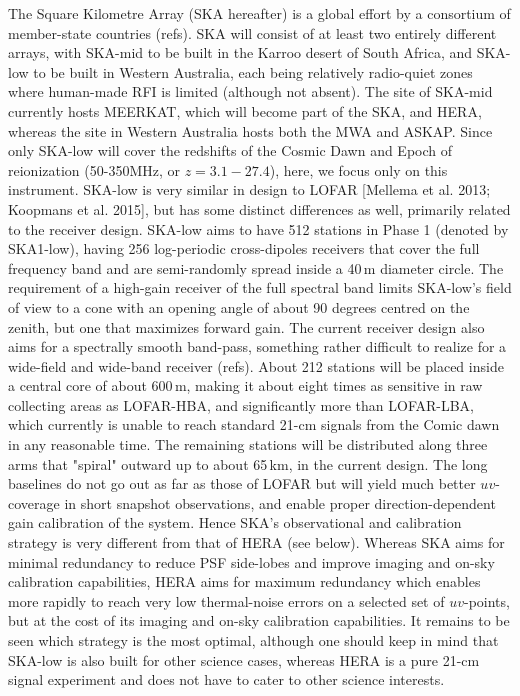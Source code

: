 The Square Kilometre Array (SKA hereafter) is a global effort by a consortium of member-state countries (refs). SKA will consist of at least two entirely different arrays, with SKA-mid to be built in the Karroo desert of South Africa, and SKA-low to be built in Western Australia, each being relatively radio-quiet zones where human-made RFI is limited (although not absent). The site of SKA-mid currently hosts MEERKAT, which will become part of the SKA, and HERA, whereas the site in Western Australia hosts both the MWA and ASKAP. Since only SKA-low will cover the redshifts of the Cosmic Dawn and Epoch of reionization (50-350MHz, or $z=3.1-27.4$), here, we focus only on this instrument. 
%
SKA-low is very similar in design to LOFAR [Mellema et al. 2013; Koopmans et al. 2015], but has some distinct differences as well, primarily related to the receiver design. SKA-low aims to have 512 stations in Phase 1 (denoted by SKA1-low), having 256 log-periodic cross-dipoles receivers that cover the full frequency band and are semi-randomly spread inside a 40\,m diameter circle. The requirement of a high-gain receiver of the full spectral band limits SKA-low's field of view to a cone with an opening angle of about 90 degrees centred on the zenith, but one that maximizes forward gain. The current receiver design also aims for a spectrally smooth band-pass, something rather difficult to realize for a wide-field and wide-band receiver (refs).
%
About 212 stations will be placed inside a central core of about 600\,m, making it about eight times as sensitive in raw collecting areas as LOFAR-HBA, and significantly more than LOFAR-LBA, which currently is unable to reach standard 21-cm signals from the Comic dawn in any reasonable time. The remaining stations will be distributed along three arms that "spiral" outward up to about 65\,km, in the current design.  The long baselines do not go out as far as those of LOFAR but will yield much better $uv$-coverage in short snapshot observations, and enable proper direction-dependent gain calibration of the system. Hence SKA's observational and calibration strategy is very different from that of  HERA (see below). Whereas SKA aims for minimal redundancy to reduce PSF side-lobes and improve imaging and on-sky calibration capabilities, HERA aims for maximum redundancy which enables more rapidly to reach very low thermal-noise errors on a selected set of $uv$-points, but at the cost of its imaging and on-sky calibration capabilities. It remains to be seen which strategy is the most optimal, although one should keep in mind that SKA-low is also built for other science cases, whereas HERA is a pure 21-cm signal experiment and does not have to cater to other science interests. 
